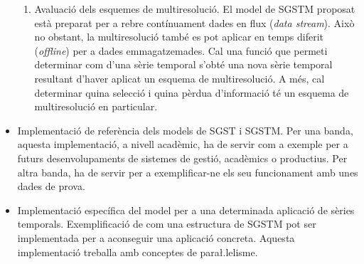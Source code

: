 \begin{itemize}
\begin{enumerate}
 \item Avaluació dels esquemes de multiresolució.  El model de SGSTM
    proposat està preparat per a rebre contínuament dades en flux
    (\emph{data stream}). Això no obstant, la multiresolució també es
    pot aplicar en temps diferit (\emph{offline}) per a dades
    emmagatzemades. Cal una funció que permeti determinar com d'una
    sèrie temporal s'obté una nova sèrie temporal resultant d'haver
    aplicat un esquema de multiresolució. A més, cal determinar quina
    selecció i quina pèrdua d'informació té un esquema de
    multiresolució en particular.

  \end{enumerate}

\item Implementació de referència dels models de SGST i SGSTM. Per una
  banda, aquesta implementació, a nivell acadèmic, ha de servir com a
  exemple per a futurs desenvolupaments de sistemes de gestió,
  acadèmics o productius. Per altra banda, ha de servir per a
  exemplificar-ne els seu funcionament amb unes dades de prova.

\item Implementació específica del model per a una determinada
  aplicació de sèries temporals. Exemplificació de com una estructura
  de SGSTM pot ser implementada per a aconseguir una aplicació
  concreta. Aquesta implementació treballa amb conceptes de
  para\l.lelisme.

\end{itemize} 





